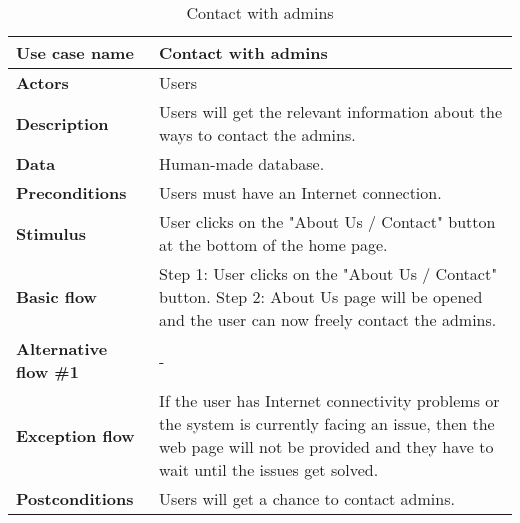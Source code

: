 \documentclass[listof=nochaptergap]{report}
\begin{document}
    \begin{table}[H]
        \centering
         \begin{tabular}{| p{4cm} | p{10cm} |} 
         \hline
         \textbf{Use case name} & Contact with admins \\
         \hline
         \textbf{Actors} & Users \\
         \hline
         \textbf{Description} & Users will get the relevant information about the ways to contact the admins. \\
         \hline
         \textbf{Data} & Human-made database. \\
         \hline
         \textbf{Preconditions} & Users must have an Internet connection. \\
         \hline
         \textbf{Stimulus} & User clicks on the "About Us / Contact" button at the bottom of the home page. \\
         \hline
         \textbf{Basic flow} & Step 1: User clicks on the "About Us / Contact" button. \newline Step 2: About Us page will be opened and the user can now freely contact the admins. \\
         \hline
         \textbf{Alternative flow \#1} & - \\
         \hline
         \textbf{Exception flow} & If the user has Internet connectivity problems or the system is currently facing an issue, then the web page will not be provided and they have to wait until the issues get solved. \\
         \hline
         \textbf{Postconditions} & Users will get a chance to contact admins. \\
         \hline
         \end{tabular}
        \caption{Contact with admins}
        \label{tab:table6}
    \end{table}
\end{document}
